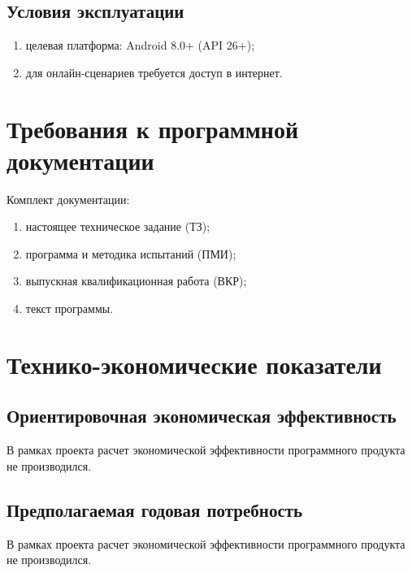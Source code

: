 \documentclass[12pt,a4paper]{article}
\begin{document}
\subsection{Условия эксплуатации}
\begin{enumerate}
  \item целевая платформа: Android 8.0+ (API 26+);
  \item для онлайн-сценариев требуется доступ в интернет.
\end{enumerate}

\clearpage
\section{Требования к программной документации}
Комплект документации:
\begin{enumerate}
  \item настоящее техническое задание (ТЗ);
  \item программа и методика испытаний (ПМИ);
  \item выпускная квалификационная работа (ВКР);
  \item текст программы.
\end{enumerate}

\clearpage
\section{Технико-экономические показатели}

\subsection{Ориентировочная экономическая эффективность}
В рамках проекта расчет экономической эффективности программного продукта не производился.

\subsection{Предполагаемая годовая потребность}
В рамках проекта расчет экономической эффективности программного продукта не производился.
\end{document}
